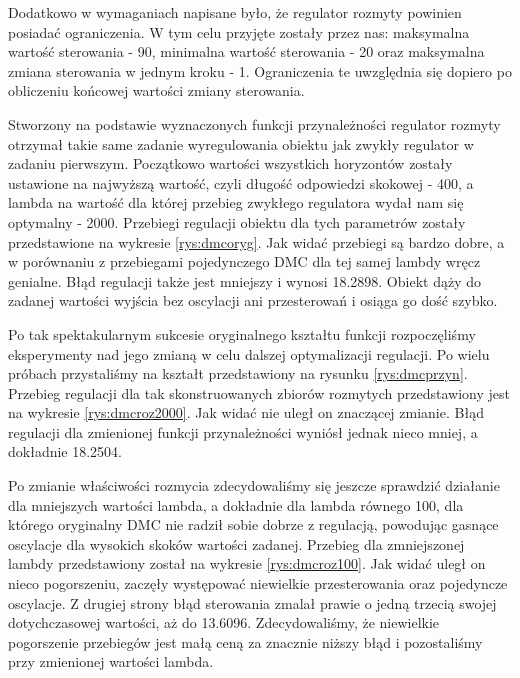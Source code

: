 		Dodatkowo w wymaganiach napisane było, że regulator rozmyty powinien posiadać ograniczenia. W tym celu przyjęte zostały przez nas: maksymalna wartość sterowania - 90, minimalna wartość sterowania - 20 oraz maksymalna zmiana sterowania w jednym kroku - 1. Ograniczenia te uwzględnia się dopiero po obliczeniu końcowej wartości zmiany sterowania.
		
		Stworzony na podstawie wyznaczonych funkcji przynależności regulator rozmyty otrzymał takie same zadanie wyregulowania obiektu jak zwykły regulator w zadaniu pierwszym. Początkowo wartości wszystkich horyzontów zostały ustawione na najwyższą wartość, czyli długość odpowiedzi skokowej - 400, a lambda na wartość dla której przebieg zwykłego regulatora wydał nam się optymalny - 2000. Przebiegi regulacji obiektu dla tych parametrów zostały przedstawione na wykresie \ref{rys:dmcoryg}. Jak widać przebiegi są bardzo dobre, a w porównaniu z przebiegami pojedynczego DMC dla tej samej lambdy wręcz genialne. Błąd regulacji także jest mniejszy i wynosi 18.2898. Obiekt dąży do zadanej wartości wyjścia bez oscylacji ani przesterowań i osiąga go dość szybko.
		
		Po tak spektakularnym sukcesie oryginalnego kształtu funkcji rozpoczęliśmy eksperymenty nad jego zmianą w celu dalszej optymalizacji regulacji. Po wielu próbach przystaliśmy na kształt przedstawiony na rysunku \ref{rys:dmcprzyn}. Przebieg regulacji dla tak skonstruowanych zbiorów rozmytych przedstawiony jest na wykresie \ref{rys:dmcroz2000}. Jak widać nie uległ on znaczącej zmianie. Błąd regulacji dla zmienionej funkcji przynależności wyniósł jednak nieco mniej, a dokładnie 18.2504.
		
		Po zmianie właściwości rozmycia zdecydowaliśmy się jeszcze sprawdzić działanie dla mniejszych wartości lambda, a dokładnie dla lambda równego 100, dla którego oryginalny DMC nie radził sobie dobrze z regulacją, powodując gasnące oscylacje dla wysokich skoków wartości zadanej. Przebieg dla zmniejszonej lambdy przedstawiony został na wykresie \ref{rys:dmcroz100}. Jak widać uległ on nieco pogorszeniu, zaczęły występować niewielkie przesterowania oraz pojedyncze oscylacje. Z drugiej strony błąd sterowania zmalał prawie o jedną trzecią swojej dotychczasowej wartości, aż do 13.6096. Zdecydowaliśmy, że niewielkie pogorszenie przebiegów jest małą ceną za znacznie niższy błąd i pozostaliśmy przy zmienionej wartości lambda.
		
